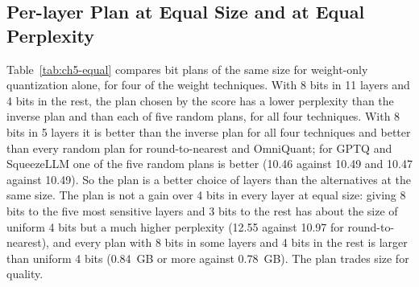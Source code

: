 \documentclass[
11pt, %
english, %
singlespacing, %
headsepline, %
]{MastersDoctoralThesis} %
\begin{document}
\subsection{Per-layer Plan at Equal Size and at Equal Perplexity}

Table~\ref{tab:ch5-equal} compares bit plans of the same size for weight-only quantization alone, for four of the weight techniques. With 8 bits in 11 layers and 4 bits in the rest, the plan chosen by the score has a lower perplexity than the inverse plan and than each of five random plans, for all four techniques. With 8 bits in 5 layers it is better than the inverse plan for all four techniques and better than every random plan for round-to-nearest and OmniQuant; for GPTQ and SqueezeLLM one of the five random plans is better (10.46 against 10.49 and 10.47 against 10.49). So the plan is a better choice of layers than the alternatives at the same size. The plan is not a gain over 4 bits in every layer at equal size: giving 8 bits to the five most sensitive layers and 3 bits to the rest has about the size of uniform 4 bits but a much higher perplexity (12.55 against 10.97 for round-to-nearest), and every plan with 8 bits in some layers and 4 bits in the rest is larger than uniform 4 bits (0.84~GB or more against 0.78~GB). The plan trades size for quality.
\end{document}
